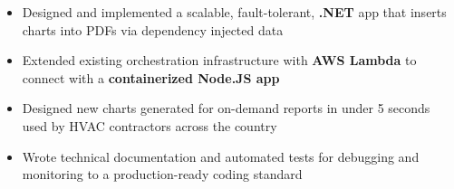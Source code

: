 \begin{itemize}
    \item Designed and implemented a scalable, fault-tolerant, \textbf{.NET} app that inserts charts into PDFs via dependency injected data
    \item Extended existing orchestration infrastructure with \textbf{AWS Lambda} to connect with a \textbf{containerized Node.JS app}
    \item Designed new charts generated for on-demand reports in under 5 seconds used by HVAC contractors across the country
    \item Wrote technical documentation and automated tests for debugging and monitoring to a production-ready coding standard
\end{itemize}